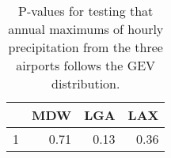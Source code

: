 \begin{table}[ht]
\centering
\caption{P-values for testing that annual maximums of hourly 
            precipitation from the three airports follows the GEV distribution.} 
\label{table:precipitation}
\begin{tabular}{rrrr}
  \hline
 & MDW & LGA & LAX \\ 
  \hline
1 & 0.71 & 0.13 & 0.36 \\ 
   \hline
\end{tabular}
\end{table}

